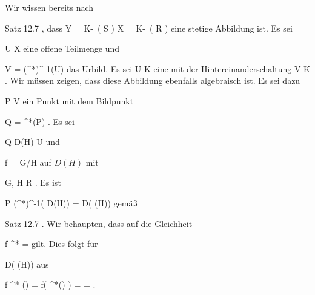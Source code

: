 {





Wir wissen bereits nach

Satz 12.7
,
dass
\maabbdisp {} { Y = K\!-\!\, \left(  S  \right) } { X = K\!-\!\, \left(  R  \right)
} {}
eine stetige Abbildung ist. Es sei

\mavergleichskette
{\vergleichskette
{ U
}
{ \subseteq }{ X
}
{  }{
}
{    }{
}
{   }{
}
}
{}{}{}
eine offene Teilmenge und

\mavergleichskette
{\vergleichskette
{ V
}
{ = }{ (\varphi^*)^{-1}(U)
}
{  }{
}
{    }{
}
{   }{
}
}
{}{}{}
das Urbild. Es sei
 { U } { K
} {}
eine
mit der Hintereinanderschaltung
 { V } { K
} {.}
Wir müssen zeigen, dass diese Abbildung ebenfalls algebraisch ist. Es sei dazu

\mavergleichskette
{\vergleichskette
{ P
}
{ \in }{ V
}
{  }{
}
{    }{
}
{   }{
}
}
{}{}{}
ein Punkt mit dem Bildpunkt

\mavergleichskette
{\vergleichskette
{ Q
}
{ = }{ \varphi^*(P)
}
{  }{
}
{    }{
}
{   }{
}
}
{}{}{.}
Es sei

\mavergleichskette
{\vergleichskette
{ Q
}
{ \in }{ D(H)
}
{ \subseteq }{ U
}
{    }{
}
{   }{
}
}
{}{}{}
und

\mavergleichskette
{\vergleichskette
{ f
}
{ = }{ G/H
}
{  }{
}
{    }{
}
{   }{
}
}
{}{}{}
auf $D(H)$ mit

\mavergleichskette
{\vergleichskette
{ G, H
}
{ \in }{ R
}
{  }{
}
{    }{
}
{   }{
}
}
{}{}{.}
Es ist

\mavergleichskettedisp
{\vergleichskette
{ P
}
{ \in} { (\varphi^*)^{-1}( D(H))
}
{ =} { D( \varphi (H))
}
{ } {
}
{ } {
}
}
{}{}{}
gemäß

Satz 12.7
.
Wir behaupten, dass auf
 die Gleichheit

\mavergleichskette
{\vergleichskette
{ f \circ \varphi^*
}
{ = }{ {  }
}
{  }{
}
{    }{
}
{   }{
}
}
{}{}{}
gilt. Dies folgt für

\mavergleichskette
{\vergleichskette
{ 
}
{ \in }{ D( \varphi (H))
}
{  }{
}
{    }{
}
{   }{
}
}
{}{}{}
aus

\mavergleichskettedisp
{\vergleichskette
{ f \circ \varphi^*   ()
}
{ =} { f( \varphi^*() )
}
{ =} { 
}
{ =} { 
}
{ } {
}
}
{}{}{.}




}




